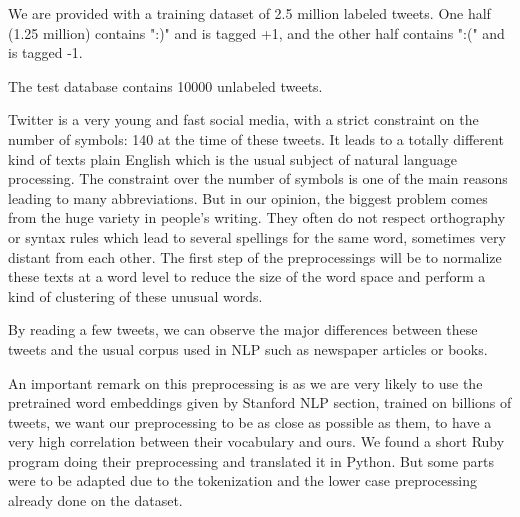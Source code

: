 \documentclass[10pt,conference,compsocconf]{IEEEtran}
\begin{document}
We are provided with a training dataset of 2.5 million labeled tweets. One half (1.25 million) contains ":)" and is tagged +1, and the other half contains ":(" and is tagged -1.

The test database contains 10000 unlabeled tweets.

Twitter is a very young and fast social media, with a strict constraint on the number of symbols: 140 at the time of these tweets. It leads to a totally different kind of texts plain English which is the usual subject of natural language processing. The constraint over the number of symbols is one of the main reasons leading to many abbreviations. But in our opinion, the biggest problem comes from the huge variety in people's writing. They often do not respect orthography or syntax rules which lead to several spellings for the same word, sometimes very distant from each other. The first step of the preprocessings will be to normalize these texts at a word level to reduce the size of the word space and perform a kind of clustering of these unusual words.

By reading a few tweets, we can observe the major differences between these tweets and the usual corpus used in NLP such as newspaper articles or books.

An important remark on this preprocessing is as we are very likely to use the pretrained word embeddings given by Stanford NLP section, trained on billions of tweets, we want our preprocessing to be as close as possible as them, to have a very high correlation between their vocabulary and ours. We found a short Ruby program doing their preprocessing and translated it in Python. But some parts were to be adapted due to the tokenization and the lower case preprocessing already done on the dataset.
\end{document}
